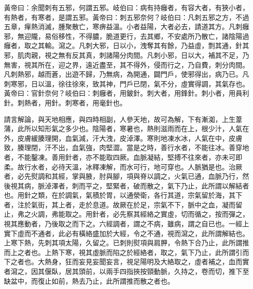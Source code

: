 黃帝曰：余聞刺有五邪，何謂五邪。岐伯曰：病有持癰者，有容大者，有狹小者，有熱者，有寒者，是謂五邪。黃帝曰：刺五邪奈何？岐伯曰：凡刺五邪之方，不過五章，癉熱消滅，腫聚散亡，寒痹益溫。小者益陽，大者必去，請道其方。凡刺癰邪，無迎隴，易俗移性，不得膿，脆道更行，去其鄉，不安處所乃散亡，諸陰陽過癰者，取之其輸。瀉之。凡刺大邪，日以小，洩奪其有餘，乃益虛，剽其通，針其邪，肌肉親，視之無有反其真，刺諸陽分肉間。凡刺小邪，日以大，補其不足，乃無害，視其所在，迎之界，遠近盡至，其不得外，侵而行之，乃自費，刺分肉間。凡刺熱邪，越而蒼，出遊不歸，乃無病，為開通，闢門戶，使邪得出，病乃已。凡刺寒邪，日以溫，徐往徐來，致其神，門戶已閉，氣不分，虛實得調，其氣存也。
黃帝曰：官針奈何？岐伯曰：刺癰者，用鈹針。刺大者，用鋒針。刺小者，用員利針。刺熱者，用針。刺寒者，用毫針也。

請言解論，與天地相應，與四時相副，人參天地，故可為解，下有漸洳，上生葦蒲，此所以知形氣之多少也。陰陽者，寒暑也，熱則滋雨而在上，根少汁，人氣在外，皮膚緩腠理開，血氣減，汗大洩，皮淖澤。寒則地凍水冰，人氣在中，皮膚致，腠理閉，汗不出，血氣強，肉堅澀。當是之時，善行水者，不能往冰。善穿地者，不能鑿凍。善用針者，亦不能取四厥。血脈凝結，堅搏不往來者，亦未可即柔。故行水者，必待天溫，冰釋凍解，而水可行，地可穿也。人脈猶是也。治厥者，必先熨調和其經，掌與腋，肘與腳，項與脊以調之，火氣已通，血脈乃行，然後視其病，脈淖澤者，刺而平之，堅緊者，破而散之，氣下乃止，此所謂以解結者也。用針之類，在於調氣，氣積於胃，以通滎衛，各行其道，宗氣留於海，其下者，注於氣街，其上者，走於息道。故厥在於足，宗氣不下，脈中之血，凝而留止，弗之火調，弗能取之。用針者，必先察其經絡之實虛，切而循之，按而彈之，視其應動者，乃後取之而下之。六經調者，謂之不病，雖病，謂之自已也。一經上實下虛而不通者，此必有橫絡盛加於大經，令之不通，視而瀉之，此所謂解結也。上寒下熱，先刺其項太陽，久留之。已刺則熨項與肩胛，令熱下合乃止，此所謂推而上之者也。上熱下寒，視其虛脈而陷之於經絡者，取之，氣下乃止，此所謂引而下之者也。大熱身，狂而妄見妄聞妄言，視足陽明及大絡取之，虛者補之，血而實者瀉之，因其偃臥，居其頭前，以兩手四指挾按頸動脈，久持之，卷而切，推下至缺盆中，而復止如前，熱去乃止，此所謂推而散之者也。

